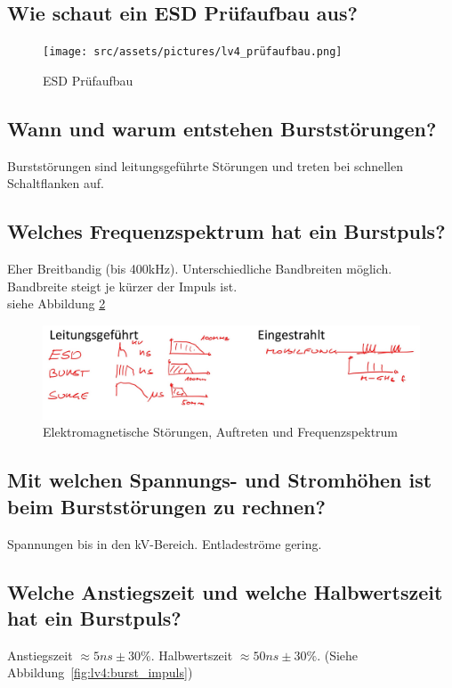 \subsection{Wie schaut ein ESD Prüfaufbau aus?}
\begin{figure}[!ht]
  \centering
  \texttt{[image: src/assets/pictures/lv4\_prüfaufbau.png]}
  \caption{ESD Prüfaufbau}\label{fig:lv4:esd_test}
\end{figure}

\subsection{Wann und warum entstehen Burststörungen?}
Burststörungen sind leitungsgeführte Störungen und treten bei schnellen Schaltflanken auf.

\subsection{Welches Frequenzspektrum hat ein Burstpuls?}
Eher Breitbandig (bis 400kHz). Unterschiedliche Bandbreiten möglich. Bandbreite steigt je kürzer der Impuls ist.\\
siehe Abbildung \ref{fig:lv4:electro_interferences}
\begin{figure}[ht]
  \centering
  \includegraphics[width=17cm]{src/assets/pictures/lv4_elektromagnetische_stoerungen.jpg}
  \caption{Elektromagnetische Störungen, Auftreten und Frequenzspektrum}\label{fig:lv4:electro_interferences}
\end{figure}

\subsection{Mit welchen Spannungs- und Stromhöhen ist beim Burststörungen zu rechnen?}
Spannungen bis in den kV-Bereich. Entladeströme gering.

\subsection{Welche Anstiegszeit und welche Halbwertszeit hat ein Burstpuls?}
Anstiegszeit \(\approx 5ns \pm 30\%\). Halbwertszeit \(\approx 50ns \pm 30\%\). (Siehe Abbildung~\ref{fig:lv4:burst_impuls})

